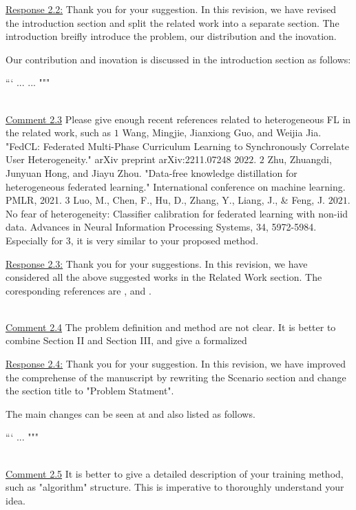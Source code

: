 \color{black}
\underline{Response 2.2:}
Thank you for your suggestion. In this revision, we have revised the introduction section and split the related work into a separate section. The introduction breifly introduce the problem, our distribution and the inovation. 

Our contribution and inovation is discussed in the introduction section as follows:

```
...
... """


~\\
\color{blue}
\underline{Comment 2.3}
Please give enough recent references related to heterogeneous FL in the related work, such as
\(1\) Wang, Mingjie, Jianxiong Guo, and Weijia Jia. "FedCL: Federated Multi-Phase Curriculum Learning to Synchronously
Correlate User Heterogeneity." arXiv preprint arXiv:2211.07248 \(2022\).
\(2\) Zhu, Zhuangdi, Junyuan Hong, and Jiayu Zhou. "Data-free knowledge distillation for heterogeneous federated learning."
International conference on machine learning. PMLR, 2021.
\(3\) Luo, M., Chen, F., Hu, D., Zhang, Y., Liang, J., \& Feng, J. \(2021\). No fear of heterogeneity: Classifier calibration for
federated learning with non-iid data. Advances in Neural Information Processing Systems, 34, 5972-5984.
Especially for 3, it is very similar to your proposed method.

\color{black}
\underline{Response 2.3:}
Thank you for your suggestions. In this revision, we have considered all the above suggested works in the Related Work section. The coresponding references are \cite{fedcl}, \cite{distillationFL} and \cite{nofearofheterogeneity}.



~\\
\color{blue}
\underline{Comment 2.4}
The problem definition and method are not clear. It is better to combine Section II and Section III, and give a formalized

\color{black}
\underline{Response 2.4:}
Thank you for your suggestion. In this revision, we have improved the comprehense of the manuscript by rewriting the Scenario section and change the section title to "Problem Statment". 

\colorbox{marygold}{The main changes can be seen at  and also listed as follows.}   

\setcounter{equation}{0}
\setcounter{section}{2}
```
...
"""

~\\
\color{blue}
\underline{Comment 2.5}
It is better to give a detailed description of your training method, such as "algorithm" structure. This is imperative to thoroughly understand your idea.

